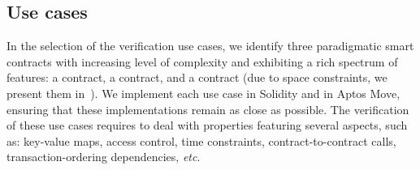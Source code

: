 \subsection{Use cases}
\label{sec:methodology:contracts}

In the selection of the verification use cases, 
we identify three paradigmatic smart contracts with increasing level of complexity and exhibiting a rich spectrum of features: a  contract, a  contract, and a  contract (due to space constraints, we  present them in~).
We implement each use case in Solidity and in Aptos Move, ensuring that these implementations remain as close as possible.
%
%
%
The verification of these use cases requires to deal with properties featuring several aspects, such as: key-value maps, access control, time constraints, contract-to-contract calls, transaction-ordering dependencies, \emph{etc}.
%
%
%



